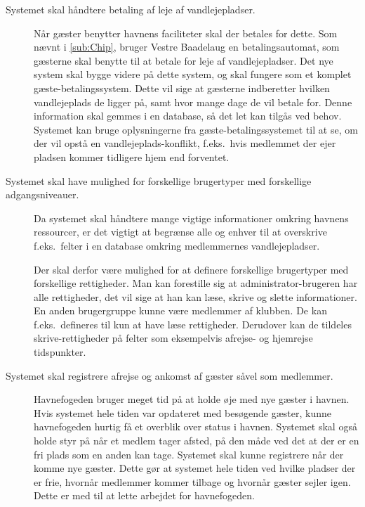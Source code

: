 \begin{description} 
  \item[Systemet skal håndtere betaling af leje af vandlejepladser.] \hfill
  
  Når gæster benytter havnens faciliteter skal der betales for dette. Som nævnt i \cref{sub:Chip}, bruger Vestre Baadelaug en betalingsautomat, som gæsterne skal benytte til at betale for leje af vandlejepladser. Det nye system skal bygge videre på dette system, og skal fungere som et komplet gæste-betalingssystem. Dette vil sige at gæsterne indberetter hvilken vandlejeplads de ligger på, samt hvor mange dage de vil betale for. Denne information skal gemmes i en database, så det let kan tilgås ved behov. Systemet kan bruge oplysningerne fra gæste-betalingssystemet til at se, om der vil opstå en vandlejeplads-konflikt, f.eks.\ hvis medlemmet der ejer pladsen kommer tidligere hjem end forventet.

  \item[Systemet skal have mulighed for forskellige brugertyper med forskellige adgangsniveauer.]

    Da systemet skal håndtere mange vigtige informationer omkring havnens ressourcer, er det vigtigt at begrænse alle og enhver til at overskrive f.eks.\ felter i en database omkring medlemmernes vandlejepladser.

    Der skal derfor være mulighed for at definere forskellige brugertyper med forskellige rettigheder. Man kan forestille sig at administrator-brugeren har alle rettigheder, det vil sige at han kan læse, skrive og slette informationer. En anden brugergruppe kunne være medlemmer af klubben. De kan f.eks.\ defineres til kun at have læse rettigheder. Derudover kan de tildeles skrive-rettigheder på felter som eksempelvis afrejse- og hjemrejse tidspunkter.

  \item[Systemet skal registrere afrejse og ankomst af gæster såvel som medlemmer.] \hfill 


  Havnefogeden bruger meget tid på at holde øje med nye gæster i havnen. Hvis systemet hele tiden var opdateret med besøgende gæster, kunne havnefogeden hurtig få et overblik over status i havnen. Systemet skal også holde styr på når et medlem tager afsted, på den måde ved det at der er en fri plads som en anden kan tage. Systemet skal kunne registrere når der komme nye gæster. Dette gør at systemet hele tiden ved hvilke pladser der er frie, hvornår medlemmer kommer tilbage og hvornår gæster sejler igen. Dette er med til at lette arbejdet for havnefogeden.


\end{description}
